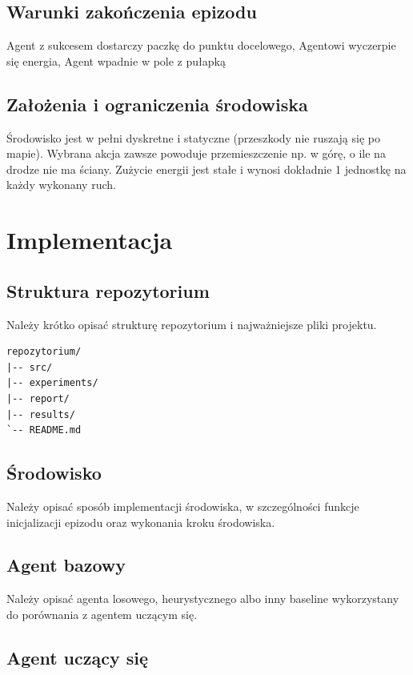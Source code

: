 \documentclass[12pt]{article}
\begin{document}
\subsection{Warunki zakończenia epizodu}

Agent z sukcesem dostarczy paczkę do punktu docelowego, Agentowi wyczerpie się energia, Agent wpadnie w pole z pułapką

\subsection{Założenia i ograniczenia środowiska}
Środowisko jest w pełni dyskretne i statyczne (przeszkody nie ruszają się po mapie).
Wybrana akcja zawsze powoduje przemieszczenie np. w górę, o ile na drodze nie ma ściany.
Zużycie energii jest stałe i wynosi dokładnie 1 jednostkę na każdy wykonany ruch.

\section{Implementacja}

\subsection{Struktura repozytorium}

Należy krótko opisać strukturę repozytorium i najważniejsze pliki projektu.

\begin{verbatim}
repozytorium/
|-- src/
|-- experiments/
|-- report/
|-- results/
`-- README.md
\end{verbatim}

\subsection{Środowisko}

Należy opisać sposób implementacji środowiska, w szczególności funkcje inicjalizacji epizodu oraz wykonania kroku środowiska.

\subsection{Agent bazowy}

Należy opisać agenta losowego, heurystycznego albo inny baseline wykorzystany do porównania z agentem uczącym się.

\subsection{Agent uczący się}
\end{document}
